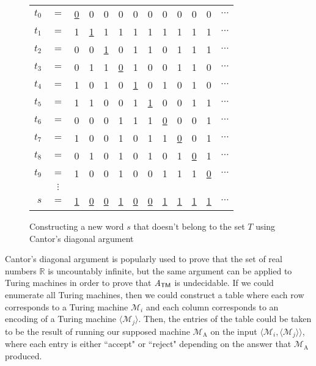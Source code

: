 \begin{figure}
\centering
\begin{tabular}{r c p{0.05em} p{0.05em} p{0.05em} p{0.05em} p{0.05em} p{0.05em} p{0.05em} p{0.05em} p{0.05em} p{0.05em} c}
$t_{0}$	& $=$	& {\leavevmode\color{\secondcolour}\ul{0}}	& 0	& 0	& 0	& 0	& 0	& 0	& 0	& 0	& 0	& $\cdots$ \\
$t_{1}$	& $=$	& 1	& {\leavevmode\color{\secondcolour}\ul{1}}	& 1	& 1	& 1	& 1	& 1	& 1	& 1	& 1	& $\cdots$ \\
$t_{2}$	& $=$	& 0	& 0	& {\leavevmode\color{\secondcolour}\ul{1}}	& 0	& 1	& 1	& 0	& 1	& 1	& 1	& $\cdots$ \\
$t_{3}$	& $=$	& 0	& 1	& 1	& {\leavevmode\color{\secondcolour}\ul{0}}	& 1	& 0	& 0	& 1	& 1	& 0	& $\cdots$ \\
$t_{4}$	& $=$	& 1	& 0	& 1	& 0	& {\leavevmode\color{\secondcolour}\ul{1}}	& 0	& 1	& 0	& 1	& 0	& $\cdots$ \\
$t_{5}$	& $=$	& 1	& 1	& 0	& 0	& 1	& {\leavevmode\color{\secondcolour}\ul{1}}	& 0	& 0	& 1	& 1	& $\cdots$ \\
$t_{6}$	& $=$	& 0	& 0	& 0	& 1	& 1	& 1	& {\leavevmode\color{\secondcolour}\ul{0}}	& 0	& 0	& 1	& $\cdots$ \\
$t_{7}$	& $=$	& 1	& 0	& 0	& 1	& 0	& 1	& 1	& {\leavevmode\color{\secondcolour}\ul{0}}	& 0	& 1	& $\cdots$ \\
$t_{8}$	& $=$	& 0	& 1	& 0	& 1	& 0	& 1	& 0	& 1	& {\leavevmode\color{\secondcolour}\ul{0}}	& 1	& $\cdots$ \\
$t_{9}$	& $=$	& 1	& 0	& 0	& 1	& 0	& 0	& 1	& 1	& 1	& {\leavevmode\color{\secondcolour}\ul{0}}	& $\cdots$ \\
		& $\vdots$	&	&	&	&	&	&	&	&	&	&	& \\
\midrule
$s$		& $=$	& {\leavevmode\color{\secondcolour}\ul{1}}	& {\leavevmode\color{\secondcolour}\ul{0}}	& {\leavevmode\color{\secondcolour}\ul{0}}	& {\leavevmode\color{\secondcolour}\ul{1}}	& {\leavevmode\color{\secondcolour}\ul{0}}	& {\leavevmode\color{\secondcolour}\ul{0}}	& {\leavevmode\color{\secondcolour}\ul{1}}	& {\leavevmode\color{\secondcolour}\ul{1}}	& {\leavevmode\color{\secondcolour}\ul{1}}	& {\leavevmode\color{\secondcolour}\ul{1}}	& $\cdots$
\end{tabular}
\caption{Constructing a new word $s$ that doesn't belong to the set $T$ using Cantor's diagonal argument}
\label{fig:cantorsdiagonalargument}
\end{figure}

Cantor's diagonal argument is popularly used to prove that the set of real numbers $\mathbb{R}$ is uncountably infinite, but the same argument can be applied to Turing machines in order to prove that $\mathit{A}_{\textsf{TM}}$ is undecidable. If we could enumerate all Turing machines, then we could construct a table where each row corresponds to a Turing machine $\mathcal{M}_{i}$ and each column corresponds to an encoding of a Turing machine $\langle \mathcal{M}_{j} \rangle$. Then, the entries of the table could be taken to be the result of running our supposed machine $\mathcal{M}_{\mathrm{A}}$ on the input $\langle \mathcal{M}_{i}, \langle \mathcal{M}_{j} \rangle \rangle$, where each entry is either ``accept" or ``reject" depending on the answer that $\mathcal{M}_{\mathrm{A}}$ produced.

